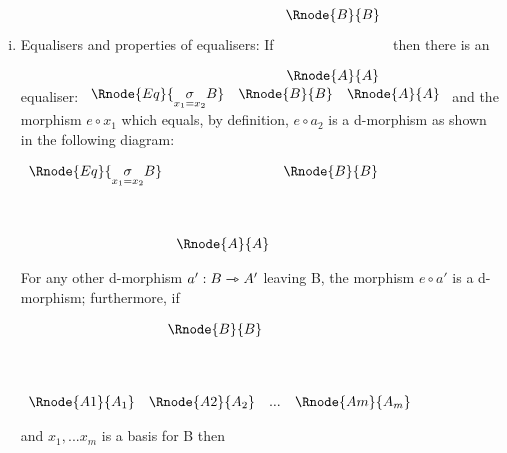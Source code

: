 \documentclass[10pt,a4paper]{article}
\begin{document}
\begin{enumerate} [(i)]
\item Equalisers and properties of equalisers: If
\setlength{\arraycolsep}{1cm}
$
\begin{array}{c}
\Rnode{B}{B} \\ [1.1cm]
\Rnode{A}{A} \\
\end{array}
$
then there is an equaliser:
\setlength{\arraycolsep}{.75cm}
$
\begin{array}{ccc}
\Rnode{Eq}{\underset{x_1=x_2}{\sigma}B} & \Rnode{B}{B}  & \Rnode{A}{A} \\
\end{array}
$
\noindent and the morphism $e \circ x_1$ which equals, by definition, $e \circ a_2$  is a d-morphism as shown
in the following diagram:
\vspace{.2cm}
\begin{center}
\setlength{\arraycolsep}{.3cm}
$
\begin{array}{ccc}
\Rnode{Eq}{\underset{x_1=x_2}{\sigma}B} & &\Rnode{B}{B} \\[1.4cm]
 & \Rnode{A}{A} &\\
\end{array}
$
\end{center}

\noindent For any other d-morphism $a':B\rightarrowtriangle A'$ leaving B, the morphism $e \circ a'$ is a d-morphism; furthermore, if
\begin{center}
\setlength{\arraycolsep}{.1cm}
$
\begin{array}{ccp{.3cm}c}
                  & \multicolumn{2}{c}{\Rnode{B}{B}}& \\ [1.4cm]
\Rnode{A1}{A_1} &\Rnode{A2}{A_2}& ... & \Rnode{Am}{A_m}\\
\end{array}
$
\end{center}
and $x_1,...x_m$ is a basis for B 
then


\end{enumerate}
\end{document}
